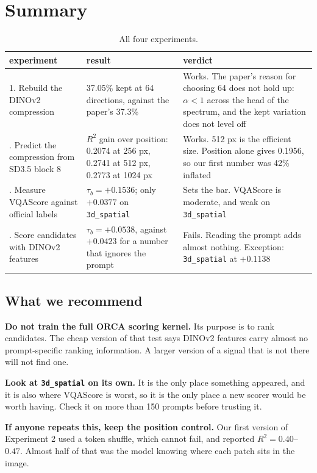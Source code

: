 \documentclass[11pt]{article}
\newcommand{\good}[1]{\textcolor{green!45!black}{#1}}
\newcommand{\bad}[1]{\textcolor{red!70!black}{#1}}
\begin{document}
\section{Summary}

\begin{table}[h]
\centering
\caption{All four experiments.}
\begin{tabular}{@{}p{3.6cm}p{4.4cm}p{5.6cm}@{}}
\toprule
experiment & result & verdict \\
\midrule
1. Rebuild the DINOv2 compression &
37.05\% kept at 64 directions, against the paper's 37.3\% &
\good{Works.} The paper's reason for choosing 64 does not hold up: $\alpha < 1$ across the head of
the spectrum, and the kept variation does not level off \\
\addlinespace
2. Predict the compression from SD3.5 block 8 &
$R^2$ gain over position: 0.2074 at 256 px, 0.2741 at 512 px, 0.2773 at 1024 px &
\good{Works.} 512 px is the efficient size. Position alone gives 0.1956, so our first number was
42\% inflated \\
\addlinespace
3. Measure VQAScore against official labels &
$\tau_b = +0.1536$; only $+0.0377$ on \texttt{3d\_spatial} &
Sets the bar. VQAScore is moderate, and weak on \texttt{3d\_spatial} \\
\addlinespace
4. Score candidates with DINOv2 features &
$\tau_b = +0.0538$, against $+0.0423$ for a number that ignores the prompt &
\bad{Fails.} Reading the prompt adds almost nothing. Exception: \texttt{3d\_spatial} at $+0.1138$ \\
\bottomrule
\end{tabular}
\end{table}

\subsection*{What we recommend}

\textbf{Do not train the full ORCA scoring kernel.} Its purpose is to rank candidates. The cheap
version of that test says DINOv2 features carry almost no prompt-specific ranking information. A
larger version of a signal that is not there will not find one.

\textbf{Look at \texttt{3d\_spatial} on its own.} It is the only place something appeared, and it is
also where VQAScore is worst, so it is the only place a new scorer would be worth having. Check it on
more than 150 prompts before trusting it.

\textbf{If anyone repeats this, keep the position control.} Our first version of Experiment 2 used a
token shuffle, which cannot fail, and reported $R^2 = 0.40$--$0.47$. Almost half of that was the
model knowing where each patch sits in the image.
\end{document}
